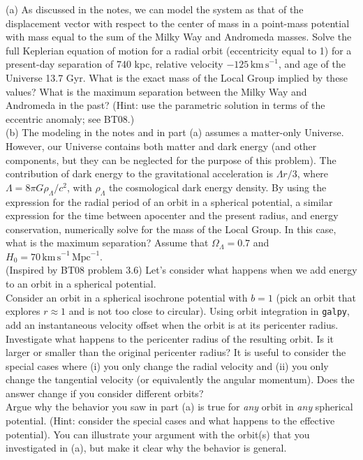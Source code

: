 \documentclass[12pt]{article}
\begin{document}
(a) As discussed in the notes, we can model the system as that of the
displacement vector with respect to the center of mass in a point-mass
potential with mass equal to the sum of the Milky Way and Andromeda
masses. Solve the full Keplerian equation of motion for a radial orbit
(eccentricity equal to 1) for a present-day separation of 740 kpc,
relative velocity $-125\,\mathrm{km\,s}^{-1}$, and age of the Universe
13.7 Gyr. What is the exact mass of the Local Group implied by these
values? What is the maximum separation between the Milky Way and
Andromeda in the past? (Hint: use the parametric solution in terms of
the eccentric anomaly; see BT08.)\\

(b) The modeling in the notes and in part (a) assumes a matter-only
Universe. However, our Universe contains both matter and dark energy
(and other components, but they can be neglected for the purpose of
this problem). The contribution of dark energy to the gravitational
acceleration is $\Lambda r / 3$, where $\Lambda = 8\pi
G\rho_\Lambda/c^2$, with $\rho_\Lambda$ the cosmological dark
energy density. By using the expression for the radial period of an
orbit in a spherical potential, a similar expression for the time
between apocenter and the present radius, and energy conservation,
numerically solve for the mass of the Local Group. In this case, what
is the maximum separation? Assume that $\Omega_\Lambda = 0.7$ and $H_0
= 70\,\mathrm{km\,s}^{-1}\,\mathrm{Mpc}^{-1}$.\\

 (Inspired by BT08 problem 3.6) Let's
consider what happens when we add energy to an orbit in a spherical
potential.\\

 Consider an orbit in a spherical isochrone
potential with $b=1$ (pick an orbit that explores $r \approx 1$ and is
not too close to circular). Using orbit integration in \texttt{galpy},
add an instantaneous velocity offset when the orbit is at its
pericenter radius. Investigate what happens to the pericenter radius
of the resulting orbit. Is it larger or smaller than the original
pericenter radius? It is useful to consider the special cases where
(i) you only change the radial velocity and (ii) you only change the
tangential velocity (or equivalently the angular momentum). Does the
answer change if you consider different orbits?\\

 Argue why the behavior you saw in part (a) is true
for \emph{any} orbit in \emph{any} spherical potential. (Hint:
consider the special cases and what happens to the effective
potential). You can illustrate your argument with the orbit(s) that
you investigated in (a), but make it clear why the behavior is general.\\
\end{document}
